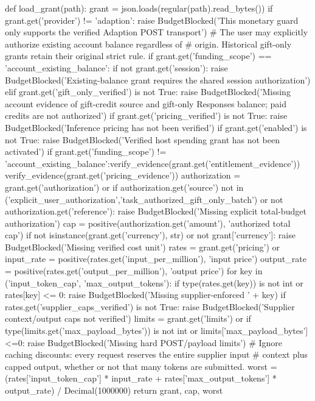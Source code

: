def load_grant(path):
    grant = json.loads(regular(path).read_bytes())
    if grant.get('provider') != 'adaption':
        raise BudgetBlocked('This monetary guard only supports the verified Adaption POST transport')
    # The user may explicitly authorize existing account balance regardless of
    # origin. Historical gift-only grants retain their original strict rule.
    if grant.get('funding_scope') == 'account_existing_balance':
        if not grant.get('session'):
            raise BudgetBlocked('Existing-balance grant requires the shared session authorization')
    elif grant.get('gift_only_verified') is not True:
        raise BudgetBlocked('Missing account evidence of gift-credit source and gift-only Responses balance; paid credits are not authorized')
    if grant.get('pricing_verified') is not True:
        raise BudgetBlocked('Inference pricing has not been verified')
    if grant.get('enabled') is not True:
        raise BudgetBlocked('Verified host spending grant has not been activated')
    if grant.get('funding_scope') != 'account_existing_balance':verify_evidence(grant.get('entitlement_evidence'))
    verify_evidence(grant.get('pricing_evidence'))
    authorization = grant.get('authorization') or {}
    if authorization.get('source') not in ('explicit_user_authorization','task_authorized_gift_only_batch') or not authorization.get('reference'):
        raise BudgetBlocked('Missing explicit total-budget authorization')
    cap = positive(authorization.get('amount'), 'authorized total cap')
    if not isinstance(grant.get('currency'), str) or not grant['currency']:
        raise BudgetBlocked('Missing verified cost unit')
    rates = grant.get('pricing') or {}
    input_rate = positive(rates.get('input_per_million'), 'input price')
    output_rate = positive(rates.get('output_per_million'), 'output price')
    for key in ('input_token_cap', 'max_output_tokens'):
        if type(rates.get(key)) is not int or rates[key] <= 0:
            raise BudgetBlocked('Missing supplier-enforced ' + key)
    if rates.get('supplier_caps_verified') is not True:
        raise BudgetBlocked('Supplier context/output caps not verified')
    limits = grant.get('limits') or {}
    if type(limits.get('max_payload_bytes')) is not int or limits['max_payload_bytes']<=0:
        raise BudgetBlocked('Missing hard POST/payload limits')
    # Ignore caching discounts: every request reserves the entire supplier input
    # context plus capped output, whether or not that many tokens are submitted.
    worst = (rates['input_token_cap'] * input_rate + rates['max_output_tokens'] * output_rate) / Decimal(1000000)
    return grant, cap, worst

